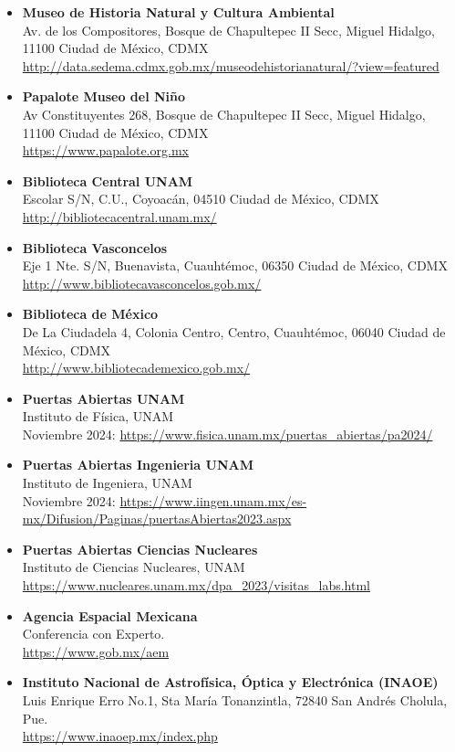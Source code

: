\begin{itemize}
    \item \textbf{Museo de Historia Natural y Cultura Ambiental}\\
    Av. de los Compositores, Bosque de Chapultepec II Secc, Miguel Hidalgo, 11100 Ciudad de México, CDMX\\
    \url{http://data.sedema.cdmx.gob.mx/museodehistorianatural/?view=featured}
    \item \textbf{Papalote Museo del Niño}\\
    Av Constituyentes 268, Bosque de Chapultepec II Secc, Miguel Hidalgo, 11100 Ciudad de México, CDMX \\
    \url{https://www.papalote.org.mx}

    \item \textbf{Biblioteca Central UNAM} \\
    Escolar S/N, C.U., Coyoacán, 04510 Ciudad de México, CDMX\\
    \url{http://bibliotecacentral.unam.mx/}

    \item \textbf{Biblioteca Vasconcelos} \\ Eje 1 Nte. S/N, Buenavista, Cuauhtémoc, 06350 Ciudad de México, CDMX \\
    \url{http://www.bibliotecavasconcelos.gob.mx/}

    \item \textbf{Biblioteca de México}\\De La Ciudadela 4, Colonia Centro, Centro, Cuauhtémoc, 06040 Ciudad de México, CDMX \\
    \url{http://www.bibliotecademexico.gob.mx/}
    
    \item \textbf{Puertas Abiertas UNAM}\\
    Instituto de Física, UNAM \\
    Noviembre 2024:
    \url{https://www.fisica.unam.mx/puertas_abiertas/pa2024/}
    \item \textbf{Puertas Abiertas Ingenieria UNAM}\\
    Instituto de Ingeniera, UNAM\\
    Noviembre 2024:
    \url{https://www.iingen.unam.mx/es-mx/Difusion/Paginas/puertasAbiertas2023.aspx}
    \item \textbf{Puertas Abiertas Ciencias Nucleares}\\
    Instituto de Ciencias Nucleares, UNAM \\
    \url{https://www.nucleares.unam.mx/dpa_2023/visitas_labs.html}
    \item\textbf{Agencia Espacial Mexicana}\\
    Conferencia con Experto. \\
    \url{https://www.gob.mx/aem}
    \item \textbf{Instituto Nacional de Astrofísica, Óptica y Electrónica (INAOE)}\\
    Luis Enrique Erro No.1, Sta María Tonanzintla, 72840 San Andrés Cholula, Pue.\\
    \url{https://www.inaoep.mx/index.php}

\end{itemize}

